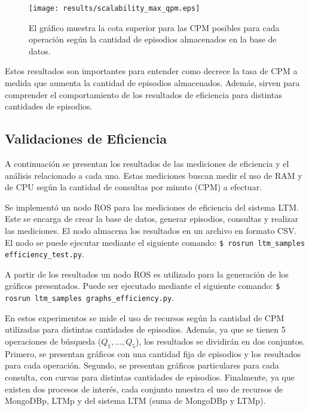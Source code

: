 \begin{figure}[!ht]
	\centering
	\texttt{[image: results/scalability\_max\_qpm.eps]}
	\caption[Escalabilidad: Cota superior para las CPM de cada operación.]
	{\small El gráfico muestra la cota superior para las CPM posibles para cada operación según la cantidad de episodios almacenados en la base de datos.}
	\label{result:scalability_max_qpm}
\end{figure}

Estos resultados son importantes para entender como decrece la tasa de CPM a medida que aumenta la cantidad de episodios almacenados. Además, sirven para comprender el comportamiento de los resultados de eficiencia para distintas cantidades de episodios.



\subsection{Validaciones de Eficiencia}

A continuación se presentan los resultados de las mediciones de eficiencia y el análisis relacionado a cada uno. Estas mediciones buscan medir el uso de RAM y de CPU según la cantidad de consultas por minuto (CPM) a efectuar.

 Se implementó un nodo ROS para las mediciones de eficiencia del sistema LTM. Este se encarga de crear la base de datos, generar episodios, consultas y realizar las mediciones. El nodo almacena los resultados en un archivo en formato CSV. El nodo se puede ejecutar mediante el siguiente comando: \texttt{\$ rosrun ltm\_samples efficiency\_test.py}.

A partir de los resultados un nodo ROS es utilizado para la generación de los gráficos presentados. Puede ser ejecutado mediante el siguiente comando:
\texttt{\$ rosrun ltm\_samples graphs\_efficiency.py}.

En estos experimentos se mide el uso de recursos según la cantidad de CPM utilizadas para distintas cantidades de episodios. Además, ya que se tienen 5 operaciones de búsqueda ($Q_1,\ldots,Q_5$), los resultados se dividirán en dos conjuntos. Primero, se presentan gráficos con una cantidad fija de episodios y los resultados para cada operación. Segundo, se presentan gráficos particulares para cada consulta, con curvas para distintas cantidades de episodios. Finalmente, ya que existen dos procesos de interés, cada conjunto muestra el uso de recursos de MongoDBp, LTMp y del sistema LTM (suma de MongoDBp y LTMp).

